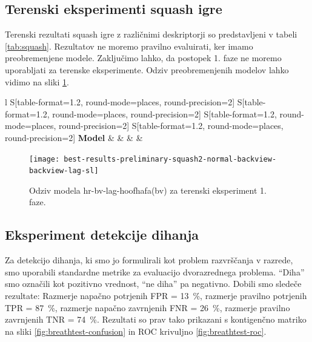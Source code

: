\subsection{Terenski eksperimenti squash igre}
Terenski rezultati squash igre z različnimi deskriptorji so predstavljeni v tabeli \ref{tab:squash}.  Rezultatov ne moremo pravilno evaluirati, ker imamo preobremenjene modele. Zaključimo lahko, da postopek 1. faze ne moremo uporabljati za terenske eksperimente. Odziv preobremenjenih modelov lahko vidimo na sliki \ref{fig:squash-rezultat}.

\begin{table}[!htbp]
	\centering
	\begin{tabular}{l S[table-format=1.2, round-mode=places, round-precision=2] S[table-format=1.2, round-mode=places, round-precision=2] S[table-format=1.2, round-mode=places, round-precision=2] S[table-format=1.2, round-mode=places, round-precision=2]}
		\toprule
		\textbf{Model} &  &  &  &  \\
		\midrule
		\bottomrule
	\end{tabular}
	\caption[Validacijske metrike terenskega testiranja]{Validacijske metrike terenskega testiranja. Tu uporabljamo HOOF in HOOF-HAFA deskriptorje. Modeli so neveljavni.}
	\label{tab:squash}
\end{table}

\begin{figure}[!htbp]
	\centering
	\texttt{[image: best-results-preliminary-squash2-normal-backview-backview-lag-sl]}
	\caption[Odziv modela hr-bv-lag-hoofhafa(bv) za terenski eksperiment 1. faze]{Odziv modela hr-bv-lag-hoofhafa(bv) za terenski eksperiment 1. faze.}
	\label{fig:squash-rezultat}
\end{figure}






















\subsection{Eksperiment detekcije dihanja}
Za detekcijo dihanja, ki smo jo formulirali kot problem razvrščanja v razrede, smo uporabili standardne metrike za evaluacijo dvorazrednega problema. ``Diha'' smo označili kot pozitivno vrednost, ``ne diha'' pa negativno. Dobili smo sledeče rezultate: Razmerje napačno potrjenih FPR = \SI{13}{\%}, razmerje pravilno potrjenih TPR = \SI{87}{\%}, razmerje napačno zavrnjenih FNR = \SI{26}{\%}, razmerje pravilno zavrnjenih TNR = \SI{74}{\%}. Rezultati so prav tako prikazani s kontigenčno matriko na sliki \ref{fig:breathtest-confusion} in ROC krivuljno \ref{fig:breathtest-roc}.

